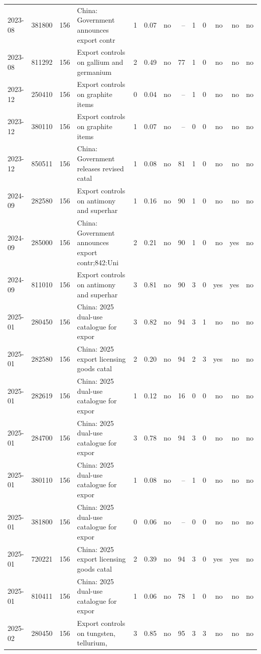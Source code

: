 \begin{minipage}{\linewidth}
\begin{tabular}{lllp{4.2cm}rrrrrrrrr}
2023-08 & 381800 & 156 & China: Government announces export contr & 1 & 0.07 & no & -- & 1 & 0 & no & no & no \\
2023-08 & 811292 & 156 & Export controls on gallium and germanium & 2 & 0.49 & no & 77 & 1 & 0 & no & no & no \\
2023-12 & 250410 & 156 & Export controls on graphite items & 0 & 0.04 & no & -- & 1 & 0 & no & no & no \\
2023-12 & 380110 & 156 & Export controls on graphite items & 1 & 0.07 & no & -- & 0 & 0 & no & no & no \\
2023-12 & 850511 & 156 & China: Government releases revised catal & 1 & 0.08 & no & 81 & 1 & 0 & no & no & no \\
2024-09 & 282580 & 156 & Export controls on antimony and superhar & 1 & 0.16 & no & 90 & 1 & 0 & no & no & no \\
2024-09 & 285000 & 156 & China: Government announces export contr;842:Uni & 2 & 0.21 & no & 90 & 1 & 0 & no & yes & no \\
2024-09 & 811010 & 156 & Export controls on antimony and superhar & 3 & 0.81 & no & 90 & 3 & 0 & yes & yes & no \\
2025-01 & 280450 & 156 & China: 2025 dual-use catalogue for expor & 3 & 0.82 & no & 94 & 3 & 1 & no & no & no \\
2025-01 & 282580 & 156 & China: 2025 export licensing goods catal & 2 & 0.20 & no & 94 & 2 & 3 & yes & no & no \\
2025-01 & 282619 & 156 & China: 2025 dual-use catalogue for expor & 1 & 0.12 & no & 16 & 0 & 0 & no & no & no \\
2025-01 & 284700 & 156 & China: 2025 dual-use catalogue for expor & 3 & 0.78 & no & 94 & 3 & 0 & no & no & no \\
2025-01 & 380110 & 156 & China: 2025 dual-use catalogue for expor & 1 & 0.08 & no & -- & 1 & 0 & no & no & no \\
2025-01 & 381800 & 156 & China: 2025 dual-use catalogue for expor & 0 & 0.06 & no & -- & 0 & 0 & no & no & no \\
2025-01 & 720221 & 156 & China: 2025 export licensing goods catal & 2 & 0.39 & no & 94 & 3 & 0 & yes & yes & no \\
2025-01 & 810411 & 156 & China: 2025 dual-use catalogue for expor & 1 & 0.06 & no & 78 & 1 & 0 & no & no & no \\
2025-02 & 280450 & 156 & Export controls on tungsten, tellurium,  & 3 & 0.85 & no & 95 & 3 & 3 & no & no & no \\

\end{tabular}
\end{minipage}
